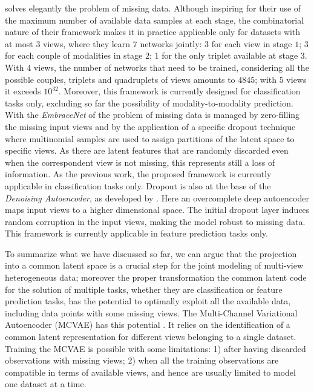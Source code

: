solves elegantly the problem of missing data.
Although inspiring for their use of the maximum number of available data samples at each stage,
the combinatorial nature of their framework makes it in practice applicable only for datasets with at most $3$ views, where they learn $7$ networks jointly:
$3$ for each view in stage $1$;
$3$ for each couple of modalities in stage $2$;
$1$ for the only triplet available at stage $3$.
With $4$ views, the number of networks that need to be trained, considering all the possible couples, triplets and quadruplets of views amounts to $4845$;
with $5$ views it exceeds $10^{32}$. 
Moreover, this framework is currently designed for classification tasks only, excluding so far the possibility of modality-to-modality prediction.
With the \textit{EmbraceNet} of \cite{embracenet} the problem of missing data is managed by zero-filling the missing input views and by the application of a specific dropout technique where multinomial samples are used to assign partitions of the latent space to specific views.
As there are latent features that are randomly discarded even when the correspondent view is not missing, this represents still a loss of information.
As the previous work, the proposed framework is currently applicable in classification tasks only.
Dropout is also at the base of the \textit{Denoising Autoencoder}, as developed by \cite{dae}.
Here an overcomplete deep autoencoder maps input views to a higher dimensional space.
The initial dropout layer induces random corruption in the input views, making the model robust to missing data.
This framework is currently applicable in feature prediction tasks only.

To summarize what we have discussed so far,
we can argue that the projection into a common latent space is a crucial step for the joint modeling of multi-view heterogeneous data;
moreover the proper transformation the common latent code for the solution of multiple tasks, whether they are classification or feature prediction tasks,
has the potential to optimally exploit all the available data, including data points with some missing views.
%
The Multi-Channel Variational Autoencoder (MCVAE) \citep{Antelmi2019} has this potential .
It relies on the identification of a common latent representation for different views belonging to a single dataset.
Training the MCVAE is possible with some limitations:
1) after having discarded observations with missing views;
2) when all the training observations are compatible in terms of available views, and hence are usually limited to model one dataset at a time.

